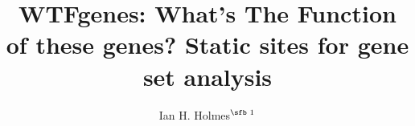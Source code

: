\documentclass{bioinfo}
\begin{document}

\newcommand\structabs[5]{
\abstract{
{\bf Motivation.}
#1
{\bf Results.}
#2
{\bf Availability and Implementation.}
#3
{\bf Contact.}
#4
{\bf Supplementary Information.}
#5
}
\maketitle
}

\title[WTFgenes]{WTFgenes: What's The Function of these genes? Static sites for gene set analysis}
\author[Ian H. Holmes]{Ian H. Holmes$^{\text{\sfb 1}}$}
\address{$^{\text{\sf 1}}$Department of Bioengineering, University of California, Berkeley, CA 94720, USA}

\corresp{}

\history{}

\editor{}


\end{document}
